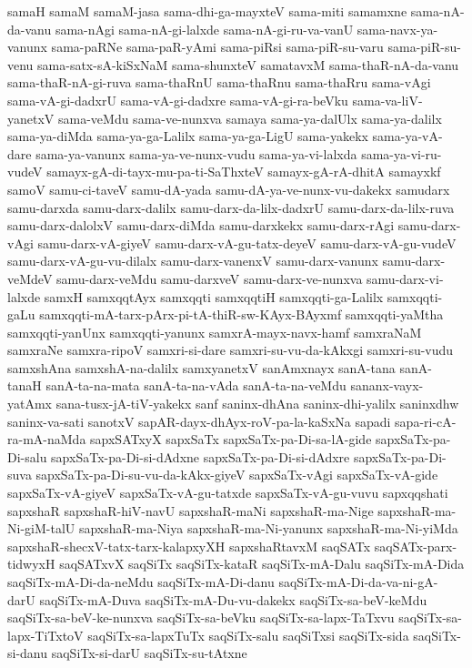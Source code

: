 {samaH
samaM
samaM-jasa
sama-dhi-ga-mayxteV
sama-miti
samamxne
sama-nA-da-vanu
sama-nAgi
sama-nA-gi-lalxde
sama-nA-gi-ru-va-vanU
sama-navx-ya-vanunx
sama-paRNe
sama-paR-yAmi
sama-piRsi
sama-piR-su-varu
sama-piR-su-venu
sama-satx-sA-kiSxNaM
sama-shunxteV
samatavxM
sama-thaR-nA-da-vanu
sama-thaR-nA-gi-ruva
sama-thaRnU
sama-thaRnu
sama-thaRru
sama-vAgi
sama-vA-gi-dadxrU
sama-vA-gi-dadxre
sama-vA-gi-ra-beVku
sama-va-liV-yanetxV
sama-veMdu
sama-ve-nunxva
samaya
sama-ya-dalUlx
sama-ya-dalilx
sama-ya-diMda
sama-ya-ga-Lalilx
sama-ya-ga-LigU
sama-yakekx
sama-ya-vA-dare
sama-ya-vanunx
sama-ya-ve-nunx-vudu
sama-ya-vi-lalxda
sama-ya-vi-ru-vudeV
samayx-gA-di-tayx-mu-pa-ti-SaThxteV
samayx-gA-rA-dhitA
samayxkf
samoV
samu-ci-taveV
samu-dA-yada
samu-dA-ya-ve-nunx-vu-dakekx
samudarx
samu-darxda
samu-darx-dalilx
samu-darx-da-lilx-dadxrU
samu-darx-da-lilx-ruva
samu-darx-dalolxV
samu-darx-diMda
samu-darxkekx
samu-darx-rAgi
samu-darx-vAgi
samu-darx-vA-giyeV
samu-darx-vA-gu-tatx-deyeV
samu-darx-vA-gu-vudeV
samu-darx-vA-gu-vu-dilalx
samu-darx-vanenxV
samu-darx-vanunx
samu-darx-veMdeV
samu-darx-veMdu
samu-darxveV
samu-darx-ve-nunxva
samu-darx-vi-lalxde
samxH
samxqqtAyx
samxqqti
samxqqtiH
samxqqti-ga-Lalilx
samxqqti-gaLu
samxqqti-mA-tarx-pArx-pi-tA-thiR-sw-KAyx-BAyxmf
samxqqti-yaMtha
samxqqti-yanUnx
samxqqti-yanunx
samxrA-mayx-navx-hamf
samxraNaM
samxraNe
samxra-ripoV
samxri-si-dare
samxri-su-vu-da-kAkxgi
samxri-su-vudu
samxshAna
samxshA-na-dalilx
samxyanetxV
sanAmxnayx
sanA-tana
sanA-tanaH
sanA-ta-na-mata
sanA-ta-na-vAda
sanA-ta-na-veMdu
sananx-vayx-yatAmx
sana-tusx-jA-tiV-yakekx
sanf
saninx-dhAna
saninx-dhi-yalilx
saninxdhw
saninx-va-sati
sanotxV
sapAR-dayx-dhAyx-roV-pa-la-kaSxNa
sapadi
sapa-ri-cA-ra-mA-naMda
sapxSATxyX
sapxSaTx
sapxSaTx-pa-Di-sa-lA-gide
sapxSaTx-pa-Di-salu
sapxSaTx-pa-Di-si-dAdxne
sapxSaTx-pa-Di-si-dAdxre
sapxSaTx-pa-Di-suva
sapxSaTx-pa-Di-su-vu-da-kAkx-giyeV
sapxSaTx-vAgi
sapxSaTx-vA-gide
sapxSaTx-vA-giyeV
sapxSaTx-vA-gu-tatxde
sapxSaTx-vA-gu-vuvu
sapxqqshati
sapxshaR
sapxshaR-hiV-navU
sapxshaR-maNi
sapxshaR-ma-Nige
sapxshaR-ma-Ni-giM-talU
sapxshaR-ma-Niya
sapxshaR-ma-Ni-yanunx
sapxshaR-ma-Ni-yiMda
sapxshaR-shecxV-tatx-tarx-kalapxyXH
sapxshaRtavxM
saqSATx
saqSATx-parx-tidwyxH
saqSATxvX
saqSiTx
saqSiTx-kataR
saqSiTx-mA-Dalu
saqSiTx-mA-Dida
saqSiTx-mA-Di-da-neMdu
saqSiTx-mA-Di-danu
saqSiTx-mA-Di-da-va-ni-gA-darU
saqSiTx-mA-Duva
saqSiTx-mA-Du-vu-dakekx
saqSiTx-sa-beV-keMdu
saqSiTx-sa-beV-ke-nunxva
saqSiTx-sa-beVku
saqSiTx-sa-lapx-TaTxvu
saqSiTx-sa-lapx-TiTxtoV
saqSiTx-sa-lapxTuTx
saqSiTx-salu
saqSiTxsi
saqSiTx-sida
saqSiTx-si-danu
saqSiTx-si-darU
saqSiTx-su-tAtxne
}
